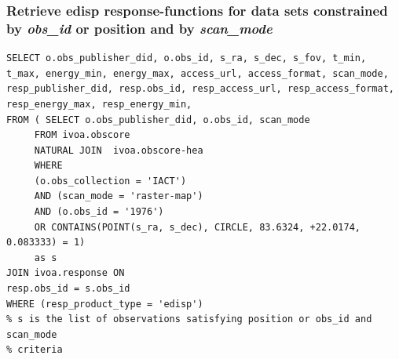 \subsubsection*{Retrieve {\bf edisp} {\bf response-function}s for data sets constrained by {\em obs\_id} or position and by {\em scan\_mode}}
{\small
\begin{verbatim}
SELECT o.obs_publisher_did, o.obs_id, s_ra, s_dec, s_fov, t_min,
t_max, energy_min, energy_max, access_url, access_format, scan_mode,
resp_publisher_did, resp.obs_id, resp_access_url, resp_access_format, 
resp_energy_max, resp_energy_min, 
FROM ( SELECT o.obs_publisher_did, o.obs_id, scan_mode 
     FROM ivoa.obscore 
     NATURAL JOIN  ivoa.obscore-hea  
     WHERE
     (o.obs_collection = 'IACT') 
     AND (scan_mode = 'raster-map')
     AND (o.obs_id = '1976')
     OR CONTAINS(POINT(s_ra, s_dec), CIRCLE, 83.6324, +22.0174, 0.083333) = 1)
     as s
JOIN ivoa.response ON 
resp.obs_id = s.obs_id
WHERE (resp_product_type = 'edisp')
% s is the list of observations satisfying position or obs_id and scan_mode
% criteria
\end{verbatim}
}%



